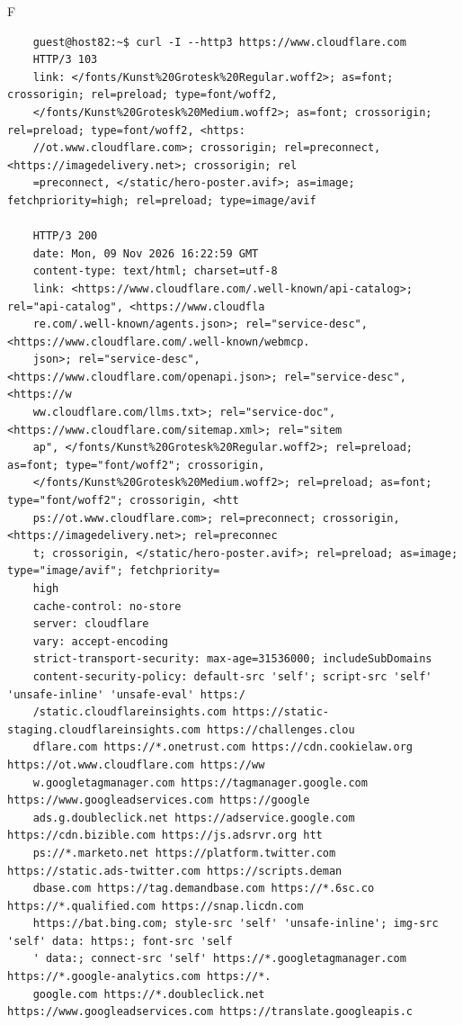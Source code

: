 \begin{maintask}{F}
\begin{termout}[H]
\begin{verbatim}
    guest@host82:~$ curl -I --http3 https://www.cloudflare.com 
    HTTP/3 103 
    link: </fonts/Kunst%20Grotesk%20Regular.woff2>; as=font; crossorigin; rel=preload; type=font/woff2, 
    </fonts/Kunst%20Grotesk%20Medium.woff2>; as=font; crossorigin; rel=preload; type=font/woff2, <https:
    //ot.www.cloudflare.com>; crossorigin; rel=preconnect, <https://imagedelivery.net>; crossorigin; rel
    =preconnect, </static/hero-poster.avif>; as=image; fetchpriority=high; rel=preload; type=image/avif

    HTTP/3 200 
    date: Mon, 09 Nov 2026 16:22:59 GMT
    content-type: text/html; charset=utf-8
    link: <https://www.cloudflare.com/.well-known/api-catalog>; rel="api-catalog", <https://www.cloudfla
    re.com/.well-known/agents.json>; rel="service-desc", <https://www.cloudflare.com/.well-known/webmcp.
    json>; rel="service-desc", <https://www.cloudflare.com/openapi.json>; rel="service-desc", <https://w
    ww.cloudflare.com/llms.txt>; rel="service-doc", <https://www.cloudflare.com/sitemap.xml>; rel="sitem
    ap", </fonts/Kunst%20Grotesk%20Regular.woff2>; rel=preload; as=font; type="font/woff2"; crossorigin,
    </fonts/Kunst%20Grotesk%20Medium.woff2>; rel=preload; as=font; type="font/woff2"; crossorigin, <htt
    ps://ot.www.cloudflare.com>; rel=preconnect; crossorigin, <https://imagedelivery.net>; rel=preconnec
    t; crossorigin, </static/hero-poster.avif>; rel=preload; as=image; type="image/avif"; fetchpriority=
    high
    cache-control: no-store
    server: cloudflare
    vary: accept-encoding
    strict-transport-security: max-age=31536000; includeSubDomains
    content-security-policy: default-src 'self'; script-src 'self' 'unsafe-inline' 'unsafe-eval' https:/
    /static.cloudflareinsights.com https://static-staging.cloudflareinsights.com https://challenges.clou
    dflare.com https://*.onetrust.com https://cdn.cookielaw.org https://ot.www.cloudflare.com https://ww
    w.googletagmanager.com https://tagmanager.google.com https://www.googleadservices.com https://google
    ads.g.doubleclick.net https://adservice.google.com https://cdn.bizible.com https://js.adsrvr.org htt
    ps://*.marketo.net https://platform.twitter.com https://static.ads-twitter.com https://scripts.deman
    dbase.com https://tag.demandbase.com https://*.6sc.co https://*.qualified.com https://snap.licdn.com
    https://bat.bing.com; style-src 'self' 'unsafe-inline'; img-src 'self' data: https:; font-src 'self
    ' data:; connect-src 'self' https://*.googletagmanager.com https://*.google-analytics.com https://*.
    google.com https://*.doubleclick.net https://www.googleadservices.com https://translate.googleapis.c

\end{verbatim}
\end{termout}
\end{maintask}
